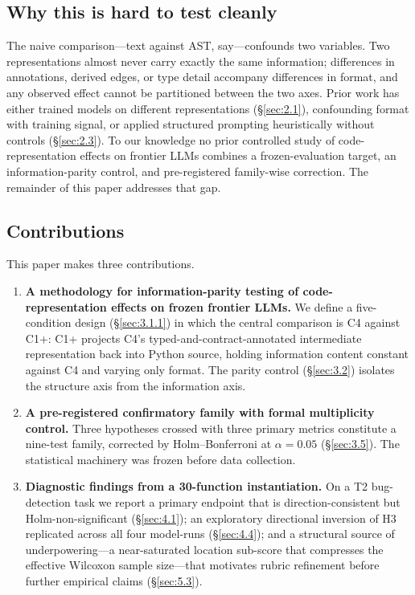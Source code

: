 \documentclass[11pt]{article}
\begin{document}
\subsection{Why this is hard to test cleanly}
\label{sec:1.2}
The naive comparison---text against AST, say---confounds two
variables. Two representations almost never carry exactly the
same information; differences in annotations, derived edges, or
type detail accompany differences in format, and any observed
effect cannot be partitioned between the two axes. Prior work
has either trained models on different representations
(\S\ref{sec:2.1}), confounding format with training signal, or
applied structured prompting heuristically without controls
(\S\ref{sec:2.3}). To our knowledge no prior controlled study of
code-representation effects on frontier LLMs combines a
frozen-evaluation target, an information-parity control, and
pre-registered family-wise correction. The remainder of this
paper addresses that gap.

\subsection{Contributions}
\label{sec:1.3}
This paper makes three contributions.

\begin{enumerate}
\item \textbf{A methodology for information-parity testing of
  code-representation effects on frozen frontier LLMs.} We
  define a five-condition design (\S\ref{sec:3.1.1}) in which the
  central comparison is C4 against C1+: C1+ projects C4's
  typed-and-contract-annotated intermediate representation back
  into Python source, holding information content constant
  against C4 and varying only format. The parity control
  (\S\ref{sec:3.2}) isolates the structure axis from the
  information axis.

\item \textbf{A pre-registered confirmatory family with formal
  multiplicity control.} Three hypotheses crossed with three
  primary metrics constitute a nine-test family, corrected by
  Holm--Bonferroni at $\alpha = 0.05$ (\S\ref{sec:3.5}). The
  statistical machinery was frozen before data collection.

\item \textbf{Diagnostic findings from a 30-function
  instantiation.} On a T2 bug-detection task we report a primary
  endpoint that is direction-consistent but Holm-non-significant
  (\S\ref{sec:4.1}); an exploratory directional inversion of H3
  replicated across all four model-runs (\S\ref{sec:4.4}); and a
  structural source of underpowering---a near-saturated location
  sub-score that compresses the effective Wilcoxon sample
  size---that motivates rubric refinement before further
  empirical claims (\S\ref{sec:5.3}).
\end{enumerate}
\end{document}
